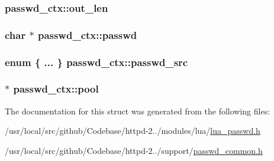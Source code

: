 \subsubsection[{\texorpdfstring{out\+\_\+len}{out_len}}]{ passwd\+\_\+ctx\+::out\+\_\+len}\hypertarget{structpasswd__ctx_a0cf82260a607c15384cfd8a98aeace9b}{}\label{structpasswd__ctx_a0cf82260a607c15384cfd8a98aeace9b}
\subsubsection[{\texorpdfstring{passwd}{passwd}}]{\setlength{\rightskip}{0pt plus 5cm}char $\ast$ passwd\+\_\+ctx\+::passwd}\hypertarget{structpasswd__ctx_a6be10f01e77b32b5a28c2fb08604c46c}{}\label{structpasswd__ctx_a6be10f01e77b32b5a28c2fb08604c46c}
\subsubsection[{\texorpdfstring{passwd\+\_\+src}{passwd_src}}]{\setlength{\rightskip}{0pt plus 5cm}enum \{ ... \}   passwd\+\_\+ctx\+::passwd\+\_\+src}\hypertarget{structpasswd__ctx_af434e862f6290b980533858aa7627c99}{}\label{structpasswd__ctx_af434e862f6290b980533858aa7627c99}
\subsubsection[{\texorpdfstring{pool}{pool}}]{ $\ast$ passwd\+\_\+ctx\+::pool}\hypertarget{structpasswd__ctx_abdb187a35f5be5af2bf82ef3363dc11b}{}\label{structpasswd__ctx_abdb187a35f5be5af2bf82ef3363dc11b}


The documentation for this struct was generated from the following files\+:\begin{DoxyCompactItemize}
\item 
/usr/local/src/github/\+Codebase/httpd-\/2../modules/lua/\hyperlink{lua__passwd_8h}{lua\+\_\+passwd.\+h}\item 
/usr/local/src/github/\+Codebase/httpd-\/2../support/\hyperlink{passwd__common_8h}{passwd\+\_\+common.\+h}\end{DoxyCompactItemize}
